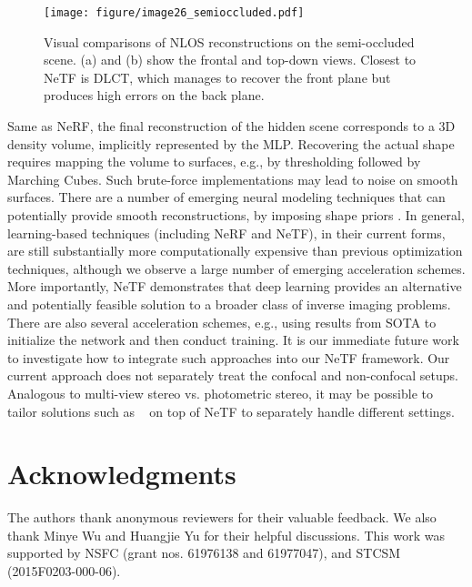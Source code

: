 \documentclass[10pt,journal,compsoc]{IEEEtran}
\newif\ifpeerreview
\begin{document}
\begin{figure}[!t]
\centering
\texttt{[image: figure/image26\_semioccluded.pdf]}
\caption{Visual comparisons of NLOS reconstructions on the semi-occluded scene. (a) and (b) show the frontal and top-down views. Closest to NeTF is DLCT, which manages to recover the front plane but produces high errors on the back plane.}
\label{Semioccluded}
\end{figure}

Same as NeRF, the final reconstruction of the hidden scene corresponds to a 3D density volume, implicitly represented by the MLP. Recovering the actual shape requires mapping the volume to surfaces, e.g., by thresholding followed by Marching Cubes. Such brute-force implementations may lead to noise on smooth surfaces. There are a number of emerging neural modeling techniques that can potentially provide smooth reconstructions, by imposing shape priors \cite{yariv2020multiview}. In general, learning-based techniques (including NeRF and NeTF), in their current forms, are still substantially more computationally expensive than previous optimization techniques, although we observe a large number of emerging acceleration schemes. More importantly, NeTF demonstrates that deep learning provides an alternative and potentially feasible solution to a broader class of inverse imaging problems. There are also several acceleration schemes, e.g., using results from SOTA to initialize the network and then conduct training. It is our immediate future work to investigate how to integrate such approaches into our NeTF framework. Our current approach does not separately treat the confocal and non-confocal setups. Analogous to multi-view stereo vs. photometric stereo, it may be possible to tailor solutions such as ~\cite{bi2020neural} on top of NeTF to separately handle different settings. 



\ifpeerreview \else
\section*{Acknowledgments}
The authors thank anonymous reviewers for their valuable feedback. We also thank Minye Wu and Huangjie Yu for their helpful discussions. This work was supported by NSFC (grant nos. 61976138 and 61977047), and STCSM (2015F0203-000-06).
\fi



\normalem
\end{document}
